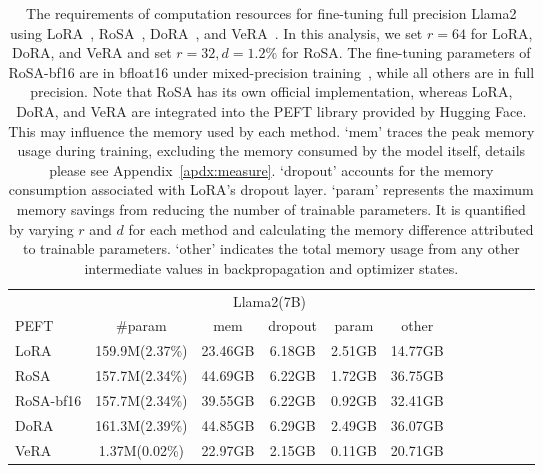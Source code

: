 \begin{table}[htbp]
\tiny
\begin{center}
\begin{tabular}{l|ccccc|cccccl}\toprule
 &  \multicolumn{5}{|c|}{Llama2(7B)} \\\cmidrule(lr){2-6}
PEFT & \#param & mem & dropout & param & other \\\midrule
LoRA & 159.9M(2.37\%) & 23.46GB & 6.18GB & 2.51GB & 14.77GB\\
RoSA & 157.7M(2.34\%) & 44.69GB & 6.22GB & 1.72GB & 36.75GB\\
RoSA-bf16 & 157.7M(2.34\%) & 39.55GB & 6.22GB & 0.92GB & 32.41GB\\
DoRA & 161.3M(2.39\%) & 44.85GB & 6.29GB & 2.49GB & 36.07GB\\
VeRA & 1.37M(0.02\%) & 22.97GB & 2.15GB & 0.11GB & 20.71GB\\\bottomrule

\end{tabular}
\caption{The requirements of computation resources for fine-tuning full precision Llama2 using LoRA~\cite{hulora}, RoSA~\cite{nikdan2024rosa}, DoRA~\cite{liu2024dora}, and VeRA~\cite{kopiczko2024vera}. In this analysis, we set $r=64$ for LoRA, DoRA, and VeRA and set $r=32, d=1.2\%$ for RoSA. The fine-tuning parameters of RoSA-bf16 are in bfloat16 under mixed-precision training~\citep{micikevicius2018mixed}, while all others are in full precision. Note that RoSA has its own official implementation, whereas LoRA, DoRA, and VeRA are integrated into the PEFT library provided by Hugging Face. This may influence the memory used by each method. `mem' traces the peak memory usage during training, excluding the memory consumed by the model itself, details please see Appendix~\ref{apdx:measure}. `dropout' accounts for the memory consumption associated with LoRA's dropout layer. `param' represents the maximum memory savings from reducing the number of trainable parameters. It is quantified by varying $r$ and $d$ for each method and calculating the memory difference attributed to trainable parameters. `other' indicates the total memory usage from any other intermediate values in backpropagation and optimizer states.} \label{tab:memory_analysis} 
\end{center}
\end{table}

